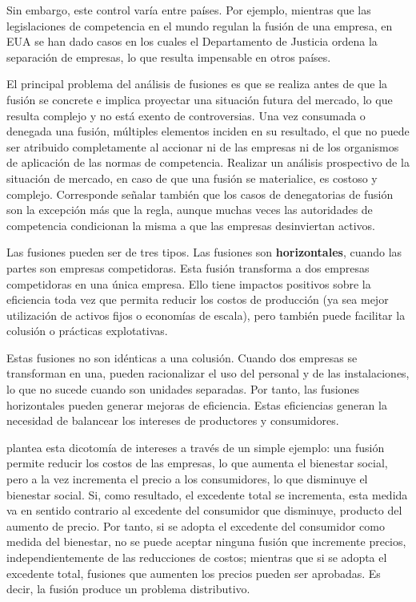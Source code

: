 \documentclass[
  12pt,
  spanish,
]{book}
\begin{document}
Sin embargo, este control varía entre países. Por ejemplo, mientras que las legislaciones de competencia en el mundo regulan la fusión de una empresa, en EUA se han dado casos en los cuales el Departamento de Justicia ordena la separación de empresas, lo que resulta impensable en otros países.

El principal problema del análisis de fusiones es que se realiza antes de que la fusión se concrete e implica proyectar una situación futura del mercado, lo que resulta complejo y no está exento de controversias. Una vez consumada o denegada una fusión, múltiples elementos inciden en su resultado, el que no puede ser atribuido completamente al accionar ni de las empresas ni de los organismos de aplicación de las normas de competencia. Realizar un análisis prospectivo de la situación de mercado, en caso de que una fusión se materialice, es costoso
y complejo. Corresponde señalar también que los casos de denegatorias de fusión son la excepción más que la regla, aunque muchas veces las autoridades de competencia condicionan la misma a que las empresas desinviertan activos.

Las fusiones pueden ser de tres tipos. Las fusiones son \textbf{horizontales}, cuando las partes son empresas competidoras. Esta fusión transforma a dos empresas competidoras en una única empresa. Ello tiene impactos positivos sobre la eficiencia toda vez que permita reducir los costos de producción (ya sea mejor utilización de activos fijos o economías de escala), pero también puede facilitar la colusión o prácticas explotativas.

Estas fusiones no son idénticas a una colusión. Cuando dos empresas se transforman en una, pueden racionalizar el uso del personal y de las instalaciones, lo que no sucede cuando son unidades separadas. Por tanto, las fusiones horizontales pueden generar mejoras de eficiencia. Estas eficiencias generan la necesidad de balancear los intereses de productores y consumidores.

\citet{Williamson1968} plantea esta dicotomía de intereses a través de un simple ejemplo: una fusión permite reducir los costos de las empresas, lo que aumenta el bienestar social, pero a la vez incrementa el precio a los consumidores, lo que disminuye el bienestar social. Si, como resultado, el excedente total se incrementa, esta medida va en sentido contrario al excedente del consumidor que disminuye, producto del aumento de precio. Por tanto, si se adopta el excedente del consumidor como medida del bienestar, no se puede aceptar ninguna fusión que incremente precios, independientemente de las reducciones de costos; mientras que si se adopta el excedente total, fusiones que aumenten los precios pueden ser aprobadas. Es decir, la fusión produce un problema distributivo.
\end{document}
